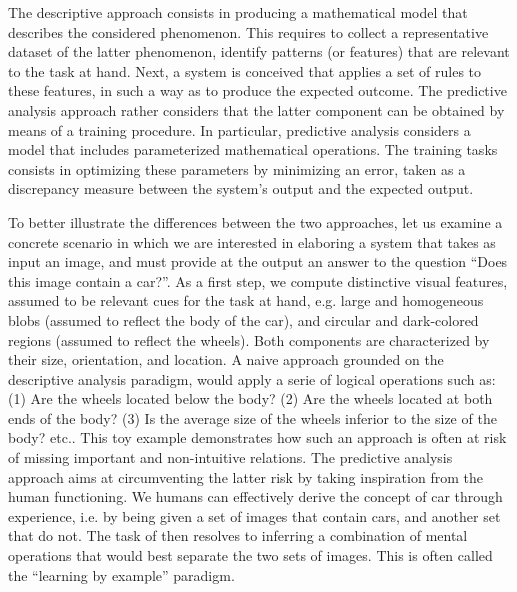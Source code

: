 The descriptive approach consists in producing a mathematical model that describes the considered phenomenon.
This requires to collect a representative dataset of the latter phenomenon, identify patterns (or features) that are relevant to the task at hand.
Next, a system is conceived that applies a set of rules to these features, in such a way as to produce the expected outcome.
The predictive analysis approach rather considers that the latter component can be obtained by means of a training procedure.
In particular, predictive analysis considers a model that includes parameterized mathematical operations. The training tasks consists in optimizing these parameters by minimizing an error, taken as a discrepancy measure between the system's output and the expected output.

To better illustrate the differences between the two approaches, let us examine a concrete scenario in which we are interested in elaboring a system that takes as input an image, and must provide at the output an answer to the question ``Does this image contain a car?''.
As a first step, we compute distinctive visual features, assumed to be relevant cues for the task at hand, e.g. large and homogeneous blobs (assumed to reflect the body of the car), and circular and dark-colored regions (assumed to reflect the wheels).
Both components are characterized by their size, orientation, and location.
A naive approach grounded on the descriptive analysis paradigm, would apply a serie of logical operations such as: (1) Are the wheels located below the body? (2) Are the wheels located at both ends of the body? (3) Is the average size of the wheels inferior to the size of the body? etc..
This toy example demonstrates how such an approach is often at risk of missing important and non-intuitive relations.
The predictive analysis approach aims at circumventing the latter risk by taking inspiration from the human functioning.
We humans can effectively derive the concept of car through experience, i.e. by being given a set of images that contain cars, and another set that do not.
The task of then resolves to inferring a combination of mental operations that would best separate the two sets of images.
This is often called the ``learning by example'' paradigm.


